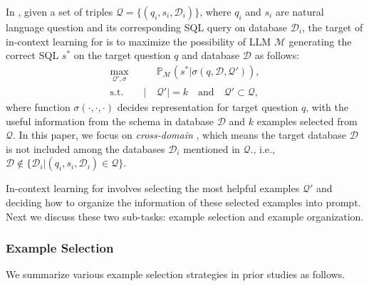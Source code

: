 In \nlsql, given a set of triples $\mathcal{Q} = \{(q_i, s_i, \mathcal{D}_i)\}$, where $q_i$ and $s_i$ are natural language question and its corresponding SQL query on database $\mathcal{D}_i$, the target of in-context learning for \nlsql is to maximize the possibility of LLM $\mathcal{M}$ generating the correct SQL $s^*$ on the target question $q$ and database $\mathcal{D}$ as follows:
\begin{align*} 
    \underset{\mathcal{Q}', \sigma}{\max}\qquad &\mathbb{P}_{\mathcal{M}}(s^*|\sigma(q, \mathcal{D}, \mathcal{Q}')), \\
    \mathrm{s.t.}\qquad|&\mathcal{Q}'| = k\quad\mathrm{and} \quad\mathcal{Q}' \subset \mathcal{Q},
\end{align*}
where function $\sigma(\cdot, \cdot, \cdot)$ decides representation for target question $q$, with the useful information from the schema in database $\mathcal{D}$ and $k$ examples selected from $\mathcal{Q}$. In this paper, we focus on \emph{cross-domain \nlsql}, which means the target database $\mathcal{D}$ is not included among the databases $\mathcal{D}_i$ mentioned in $\mathcal{Q}$., i.e., $\mathcal{D} \notin \{\mathcal{D}_i|(q_i, s_i, \mathcal{D}_i) \in \mathcal{Q}\}$.

In-context learning for \nlsql involves selecting the most helpful examples $\mathcal{Q'}$ and deciding how to organize the information of these selected examples into prompt. 
Next we discuss these two sub-tasks: example selection and example organization. 

\subsubsection{Example Selection}
\label{subsubsec:exp_select}

We summarize various example selection strategies in prior studies as follows.

